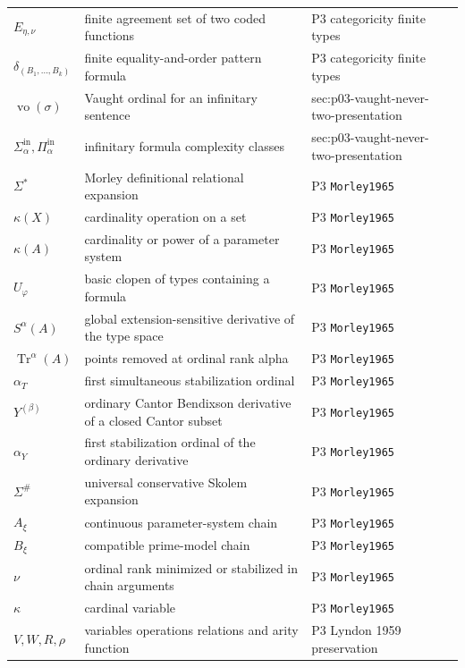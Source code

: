 \begin{longtable}{@{}p{}p{}p{}@{}}
\(E_{\eta,\nu}\) & finite agreement set of two coded functions & P3 categoricity finite types \\
\(\delta_{(B_1,\ldots,B_k)}\) & finite equality-and-order pattern formula & P3 categoricity finite types \\
\(\operatorname{vo}(\sigma)\) & Vaught ordinal for an infinitary sentence & sec:\allowbreak{}p03-\allowbreak{}vaught-\allowbreak{}never-\allowbreak{}two-\allowbreak{}presentation \\
\(\Sigma^{\mathrm{in}}_\alpha,\allowbreak \Pi^{\mathrm{in}}_\alpha\) & infinitary formula complexity classes & sec:\allowbreak{}p03-\allowbreak{}vaught-\allowbreak{}never-\allowbreak{}two-\allowbreak{}presentation \\
\(\Sigma^*\) & Morley definitional relational expansion & P3 \texttt{Morley1965} \\
\(\kappa(X)\) & cardinality operation on a set & P3 \texttt{Morley1965} \\
\(\kappa(A)\) & cardinality or power of a parameter system & P3 \texttt{Morley1965} \\
\(U_\varphi\) & basic clopen of types containing a formula & P3 \texttt{Morley1965} \\
\(S^\alpha(A)\) & global extension-sensitive derivative of the type space & P3 \texttt{Morley1965} \\
\(\operatorname{Tr}^\alpha(A)\) & points removed at ordinal rank alpha & P3 \texttt{Morley1965} \\
\(\alpha_T\) & first simultaneous stabilization ordinal & P3 \texttt{Morley1965} \\
\(Y^{(\beta)}\) & ordinary Cantor Bendixson derivative of a closed Cantor subset & P3 \texttt{Morley1965} \\
\(\alpha_Y\) & first stabilization ordinal of the ordinary derivative & P3 \texttt{Morley1965} \\
\(\Sigma^\#\) & universal conservative Skolem expansion & P3 \texttt{Morley1965} \\
\(A_\xi\) & continuous parameter-system chain & P3 \texttt{Morley1965} \\
\(B_\xi\) & compatible prime-model chain & P3 \texttt{Morley1965} \\
\(\nu\) & ordinal rank minimized or stabilized in chain arguments & P3 \texttt{Morley1965} \\
\(\kappa\) & cardinal variable & P3 \texttt{Morley1965} \\
\(V,\allowbreak W,\allowbreak R,\allowbreak \rho\) & variables operations relations and arity function & P3 Lyndon 1959 preservation \\

\end{longtable}
